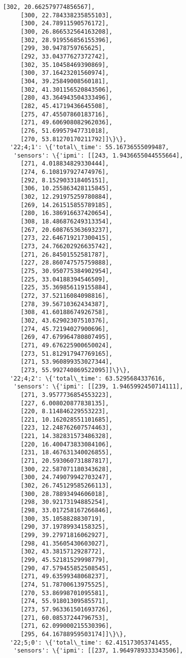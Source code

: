 \documentclass[11pt]{article}
\begin{document}
\begin{tcolorbox}[breakable, size=fbox, boxrule=.5pt, pad at break*=1mm, opacityfill=0]
\begin{Verbatim}[commandchars=\\\{\}]
     [302, 20.662579774856567],
     [300, 22.784338235855103],
     [300, 24.78911590576172],
     [300, 26.866532564163208],
     [302, 28.919556856155396],
     [299, 30.9478759765625],
     [292, 33.04377627372742],
     [302, 35.10458469390869],
     [300, 37.16423201560974],
     [304, 39.25849008560181],
     [302, 41.301156520843506],
     [280, 43.364943504333496],
     [282, 45.41719436645508],
     [275, 47.45507860183716],
     [271, 49.606908082962036],
     [276, 51.69957947731018],
     [270, 53.81270170211792]]\}\},
  '22;4;1': \{'total\_time': 55.16736555099487,
   'sensors': \{'ipmi': [[243, 1.9436655044555664],
     [271, 4.018834829330444],
     [274, 6.108197927474976],
     [292, 8.152903318405151],
     [306, 10.255863428115845],
     [302, 12.291975259780884],
     [269, 14.261515855789185],
     [280, 16.386916637420654],
     [308, 18.486876249313354],
     [267, 20.608765363693237],
     [273, 22.646719217300415],
     [273, 24.766202926635742],
     [271, 26.84501552581787],
     [227, 28.860747575759888],
     [275, 30.950775384902954],
     [225, 33.04188394546509],
     [225, 35.369856119155884],
     [272, 37.52116084098816],
     [278, 39.56710362434387],
     [308, 41.60188674926758],
     [302, 43.62902307510376],
     [274, 45.72194027900696],
     [269, 47.679964780807495],
     [271, 49.676225900650024],
     [273, 51.812917947769165],
     [271, 53.960899353027344],
     [273, 55.992740869522095]]\}\},
  '22;4;2': \{'total\_time': 63.5295684337616,
   'sensors': \{'ipmi': [[239, 1.9465992450714111],
     [271, 3.9577736854553223],
     [227, 6.008020877838135],
     [220, 8.114846229553223],
     [221, 10.162028551101685],
     [223, 12.248762607574463],
     [221, 14.382831573486328],
     [220, 16.400473833084106],
     [231, 18.467631340026855],
     [271, 20.593060731887817],
     [300, 22.587071180343628],
     [300, 24.749079942703247],
     [302, 26.745129585266113],
     [300, 28.78893494606018],
     [298, 30.92173194885254],
     [298, 33.017258167266846],
     [300, 35.1058828830719],
     [290, 37.19789934158325],
     [299, 39.27971816062927],
     [298, 41.35605430603027],
     [302, 43.3815712928772],
     [299, 45.52181529998779],
     [290, 47.579455852508545],
     [271, 49.63599348068237],
     [274, 51.78700613975525],
     [270, 53.86998701095581],
     [274, 55.91801309585571],
     [273, 57.963361501693726],
     [271, 60.08537244796753],
     [271, 62.099000215530396],
     [295, 64.16788959503174]]\}\},
  '22;5;0': \{'total\_time': 62.415173053741455,
   'sensors': \{'ipmi': [[237, 1.9649789333343506],

\end{Verbatim}
\end{tcolorbox}
\end{document}
